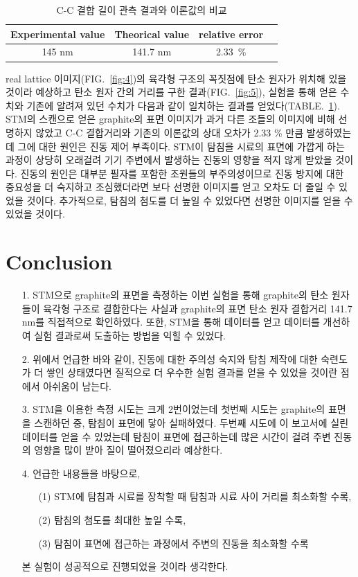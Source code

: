 \documentclass[aps,reprint,superscriptaddress,11pt]{revtex4-2}
\begin{document}
\begin{table}[htp]
  \centering\begin{tabular}
    {|c|c|c|c|}
    \hline
    Experimental value & Theorical value\cite{FitzerKochlingBoehmMarsh+1995+473+506} 
    & relative error \\
    \hline
    145 nm & 141.7 nm  & 2.33~\% \\
    \hline
  \end{tabular}
  \caption{C-C 결합 길이 관측 결과와 이론값의 비교}
  \label{tab:1}
\end{table}

real lattice 이미지(FIG.~\ref{fig:4})의 육각형 구조의 꼭짓점에 
탄소 원자가 위치해 있을 것이라 예상하고 탄소 원자 간의 거리를 구한 결과(FIG.~\ref{fig:5}),
실험을 통해 얻은 수치와 기존에 알려져 있던 수치가 다음과 같이 일치하는 결과를 
얻었다(TABLE.~\ref{tab:1}). \\
STM의 스캔으로 얻은 graphite의 표면 이미지가 과거 다른 조들의 이미지에 비해 
선명하지 않았고 C-C 결합거리와 기존의 이론값의 상대 오차가 2.33 \% 만큼 발생하였는데 그에 대한
원인은 진동 제어 부족이다. STM이 탐침을 시료의 표면에 가깝게 하는 과정이 상당히 오래걸려 기기 주변에서 
발생하는 진동의 영향을 적지 않게 받았을 것이다. 진동의 원인은 대부분 필자를 포함한 조원들의 
부주의성이므로 진동 방지에 대한 중요성을 더 숙지하고 조심했더라면 보다 선명한 이미지를 얻고 오차도 
더 줄일 수 있었을 것이다. 추가적으로, 탐침의 첨도를 더 높일 수 있었다면 선명한 이미지를
얻을 수 있었을 것이다. 



\section{Conclusion}
\begin{itemize}
  \item[1. ] STM으로 graphite의 표면을 측정하는 이번 실험을 통해 graphite의 탄소 원자들이
  육각형 구조로 결합한다는 사실과 graphite의 표면 탄소 원자 결합거리 141.7 nm를 직접적으로 확인하였다. 
  또한, STM을 통해 데이터를 얻고 데이터를 개선하여 실험 결과로써 도출하는 방법을 익힐 수 있었다.
  \item[2. ] 위에서 언급한 바와 같이, 진동에 대한 주의성 숙지와 탐침 제작에 대한 숙련도가 더
  쌓인 상태였다면 질적으로 더 우수한 실험 결과를 얻을 수 있었을 것이란 점에서 아쉬움이 남는다.
  \item[3. ] STM을 이용한 측정 시도는 크게 2번이었는데 첫번째 시도는 graphite의 표면을 스캔하던 중,
  탐침이 표면에 닿아 실패하였다. 두번째 시도에 이 보고서에 실린 데이터를 얻을 수 있었는데 
  탐침이 표면에 접근하는데 많은 시간이 걸려 주변 진동의 영향을 많이 받아 질이 떨어졌으리라 예상한다.
  \item[4. ] 언급한 내용들을 바탕으로, 
  \begin{itemize}
    \item[(1)] STM에 탐침과 시료를 장착할 때 탐침과 시료 사이 거리를 최소화할 수록,
    \item[(2)] 탐침의 첨도를 최대한 높일 수록,
    \item[(3)] 탐침이 표면에 접근하는 과정에서 주변의 진동을 최소화할 수록 
  \end{itemize}
  본 실험이 성공적으로 진행되었을 것이라 생각한다.
\end{itemize}

\nocite{*}





\vfill
\end{document}
